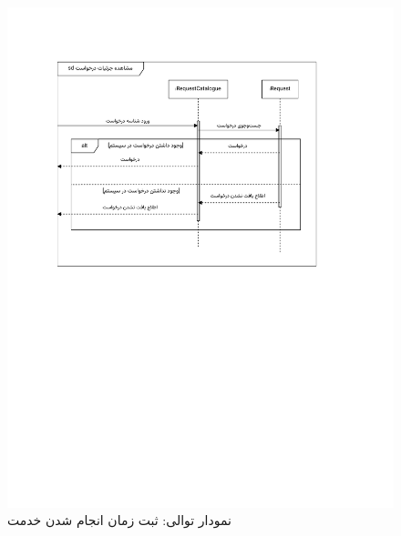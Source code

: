 \begin{figure}[ht!]
	\centering
	\includegraphics[scale=0.8, page=9]{figs/OOD-Sequence-2.pdf}
	\caption{نمودار توالی: ثبت زمان انجام شدن خدمت}
\end{figure}
\FloatBarrier
\newpage

